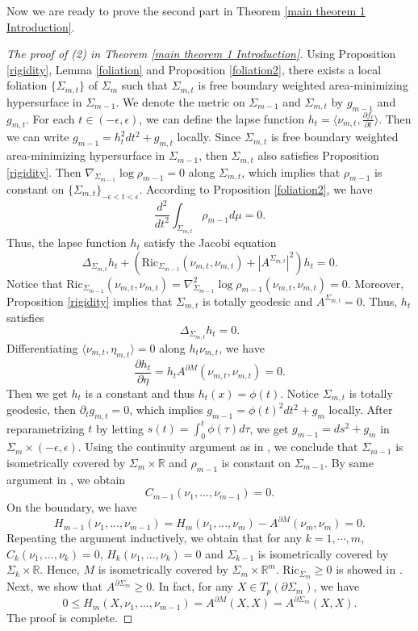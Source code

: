 \documentclass[11pt,letterpaper]{amsart}
\theoremstyle{definition}
\theoremstyle{remark}
\numberwithin{equation}{section}
\begin{document}
Now we are ready to prove the second part in Theorem \ref{main theorem 1 Introduction}.
\begin{proof}[The proof of (2) in Theorem \ref{main theorem 1 Introduction}]
    Using Proposition \ref{rigidity}, Lemma \ref{foliation} and Proposition \ref{foliation2}, there exists a local foliation $\{\Sigma_{m,t}\}$ of $\Sigma_{m}$ such that $\Sigma_{m,t}$ is free boundary weighted area-minimizing hypersurface in $\Sigma_{m-1}$. We denote the metric on $\Sigma_{m-1}$ and $\Sigma_{m,t}$ by $g_{m-1}$ and $g_{m,t}$. For each $t\in(-\epsilon,\epsilon)$, we can define the lapse function $h_{t} = \langle \nu_{m,t},\frac{\partial f_{t}}{\partial t}\rangle$. Then we can write $g_{m-1}=h_{t}^2dt^{2}+g_{m,t}$ locally. Since $\Sigma_{m,t}$ is free boundary weighted area-minimizing hypersurface in $\Sigma_{m-1}$, then $\Sigma_{m,t}$ also satisfies Proposition \ref{rigidity}. Then $\nabla_{\Sigma_{m-1}}\log\rho_{m-1}=0$ along $\Sigma_{m,t}$, which implies that $\rho_{m-1}$ is constant on $\{\Sigma_{m,t}\}_{-\epsilon<t<\epsilon}$. 
    According to Proposition \ref{foliation2}, we have
    \[
    \frac{d^2}{dt^2}\int_{\Sigma_{m,t}}\rho_{m-1}d\mu =0.
    \]
    Thus, the lapse function $h_{t}$ satisfy the Jacobi equation
    \[
    \Delta_{\Sigma_{m,t}}h_{t}+(\text{Ric}_{\Sigma_{m-1}}(\nu_{m,t},\nu_{m,t})+|A^{\Sigma_{m,t}}|^2)h_{t}=0.
    \]
    Notice that $\text{Ric}_{\Sigma_{m-1}}(\nu_{m,t},\nu_{m,t})=\nabla_{\Sigma_{m-1}}^{2}\log\rho_{m-1}(\nu_{m,t},\nu_{m,t})=0$. Moreover, Proposition \ref{rigidity} implies that $\Sigma_{m,t}$ is totally geodesic and $A^{\Sigma_{m,t}}=0$. Thus, $h_{t}$ satisfies 
    \[
        \Delta_{\Sigma_{m,t}}h_{t}=0.    
    \]
    Differentiating $\langle \nu_{m,t},\eta_{m,t}\rangle = 0$ along $h_{t}\nu_{m,t}$, we have $$\frac{\partial h_{t}}{\partial \eta}=h_{t}A^{\partial M}(\nu_{m,t},\nu_{m,t})=0.$$ Then we get $h_{t}$ is a constant and thus $h_{t}(x)=\phi(t)$. Notice $\Sigma_{m,t}$ is totally geodesic, then $\partial_{t}g_{m,t}=0$, which implies $g_{m-1}=\phi(t)^2dt^2+g_{m}$ locally. After reparametrizing $t$ by letting $s(t)=\int_{0}^{t}\phi(\tau)d\tau$, we get $g_{m-1}=ds^2+g_{m}$ in $\Sigma_{m}\times (-\epsilon,\epsilon)$. Using the continuity argument as in \cite{BrayBrenleNevesrigidity}, we conclude that $\Sigma_{m-1}$ is isometrically covered by $\Sigma_{m}\times \mathbb{R}$ and $\rho_{m-1}$ is constant on $\Sigma_{m-1}$. By same argument in \cite{ChuKwongLeerigidity}, we obtain
    \[
    C_{m-1}(\nu_{1},...,\nu_{m-1})=0.
    \]
    On the boundary, we have
    \[
        H_{m-1}(\nu_{1},...,\nu_{m-1})=H_{m}(\nu_{1},...,\nu_{m})-A^{\partial M}(\nu_{m},\nu_{m})=0.
    \]
    Repeating the argument inductively, we obtain that for any $k=1,\cdots,m$, $C_{k}(\nu_{1},...,\nu_{k})=0$, $H_{k}(\nu_{1},...,\nu_{k})=0$ and $\Sigma_{k-1}$ is isometrically covered by $\Sigma_{k}\times \mathbb{R}$. Hence, $M$ is isometrically covered by $\Sigma_{m}\times \mathbb{R}^{m}$. $\text{Ric}_{\Sigma_{m}}\geq 0$ is showed in \cite{ChuKwongLeerigidity}. Next, we show that $A^{\partial \Sigma_{m}}\geq 0$. In fact, for any $ X\in T_{p}(\partial \Sigma_{m})$, we have
    \[
    0\leq H_{m}(X,\nu_{1},...,\nu_{m-1})=A^{\partial M}(X,X)=A^{\partial \Sigma_{m}}(X,X).
    \]
    The proof is complete.
\end{proof}
\end{document}
